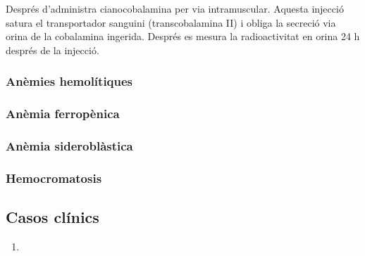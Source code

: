 
Després d'administra cianocobalamina per via intramuscular. Aquesta injecció satura el transportador sanguini (transcobalamina II) i obliga la secreció via orina de la cobalamina ingerida. Després es mesura la radioactivitat en orina 24 h després de la injecció.

\subsubsection{Anèmies hemolítiques}

\subsubsection{Anèmia ferropènica}


\subsubsection{Anèmia sideroblàstica}


\subsubsection{Hemocromatosis}


\subsection{Casos clínics}

\begin{enumerate}[\bf 1)]
\item 
\end{enumerate}
